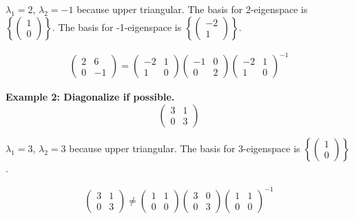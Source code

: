 \noindent
\(\lambda_1 = 2\), \(\lambda_2 = -1\) because upper triangular. The basis for 2-eigenspace is \(\left\{ \begin{pmatrix}
    1 \\ 0
\end{pmatrix} \right\}\). The basis for -1-eigenspace is \(\left\{ \begin{pmatrix}
    -2 \\ 1
\end{pmatrix} \right\}\).

\begin{align}
    \begin{pmatrix}
        2 & 6 \\ 0 & -1
    \end{pmatrix} = \begin{pmatrix}
        -2 & 1 \\ 1 & 0
    \end{pmatrix} \begin{pmatrix}
        -1 & 0 \\ 0 & 2
    \end{pmatrix}
    \begin{pmatrix}
        -2 & 1 \\ 1 & 0
    \end{pmatrix}^{-1}
\end{align}

\noindent
\newline
\textbf{Example 2: Diagonalize if possible.}
\begin{equation}
    \begin{pmatrix}
        3 & 1 \\ 0 & 3
    \end{pmatrix}
\end{equation}

\noindent
\(\lambda_1 = 3\), \(\lambda_2 = 3\) because upper triangular. The basis for 3-eigenspace is \(\left\{ \begin{pmatrix}
    1 \\ 0
\end{pmatrix} \right\}\).

\begin{align}
    \begin{pmatrix}
        3 & 1 \\ 0 & 3
    \end{pmatrix} \ne \begin{pmatrix}
        1 & 1 \\ 0 & 0
    \end{pmatrix} \begin{pmatrix}
        3 & 0 \\ 0 & 3
    \end{pmatrix}
    \begin{pmatrix}
        1 & 1 \\ 0 & 0
    \end{pmatrix}^{-1}
\end{align}

